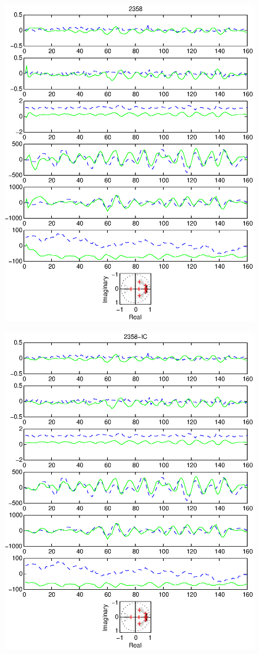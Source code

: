 \documentclass{article}
\begin{document}
\begin{figure}[htb!]\centering
\includegraphics{2358.eps}
\end{figure}\clearpage
\begin{figure}[htb!]\centering
\includegraphics{2358_ic.eps}
\end{figure}\clearpage
\end{document}
